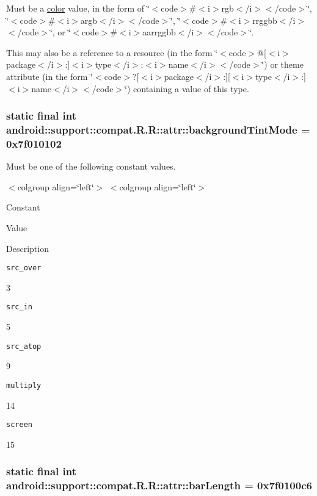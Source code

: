 Must be a \hyperlink{classandroid_1_1support_1_1compat_1_1_r_1_1color}{color} value, in the form of \char`\"{}$<$code$>$\#$<$i$>$rgb$<$/i$>$$<$/code$>$\char`\"{}, \char`\"{}$<$code$>$\#$<$i$>$argb$<$/i$>$$<$/code$>$\char`\"{}, \char`\"{}$<$code$>$\#$<$i$>$rrggbb$<$/i$>$$<$/code$>$\char`\"{}, or \char`\"{}$<$code$>$\#$<$i$>$aarrggbb$<$/i$>$$<$/code$>$\char`\"{}. 

This may also be a reference to a resource (in the form \char`\"{}$<$code$>$@\mbox{[}$<$i$>$package$<$/i$>$:\mbox{]}$<$i$>$type$<$/i$>$:$<$i$>$name$<$/i$>$$<$/code$>$\char`\"{}) or theme attribute (in the form \char`\"{}$<$code$>$?\mbox{[}$<$i$>$package$<$/i$>$:\mbox{]}\mbox{[}$<$i$>$type$<$/i$>$:\mbox{]}$<$i$>$name$<$/i$>$$<$/code$>$\char`\"{}) containing a value of this type. \hypertarget{classandroid_1_1support_1_1compat_1_1_r_1_1attr_7d8b3757a1070fb92b73d11a1ebdf0da}{
\subsubsection[{backgroundTintMode}]{\setlength{\rightskip}{0pt plus 5cm}static final int android::support::compat.R.R::attr::backgroundTintMode = 0x7f010102}}
\label{classandroid_1_1support_1_1compat_1_1_r_1_1attr_7d8b3757a1070fb92b73d11a1ebdf0da}


Must be one of the following constant values. \begin{TabularC}{0}
\hline
\end{TabularC}
$<$colgroup align=\char`\"{}left\char`\"{}$>$ $<$colgroup align=\char`\"{}left\char`\"{}$>$ 

Constant

Value

Description 

{\tt src\_\-over}

3

{\tt src\_\-in}

5

{\tt src\_\-atop}

9

{\tt multiply}

14

{\tt screen}

15\hypertarget{classandroid_1_1support_1_1compat_1_1_r_1_1attr_a0718190b3384a378faef4be435b6f09}{
\subsubsection[{barLength}]{\setlength{\rightskip}{0pt plus 5cm}static final int android::support::compat.R.R::attr::barLength = 0x7f0100c6}}
\label{classandroid_1_1support_1_1compat_1_1_r_1_1attr_a0718190b3384a378faef4be435b6f09}



